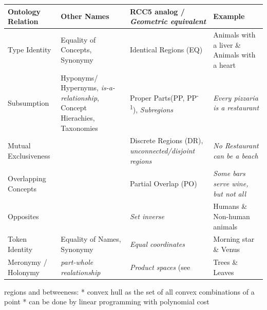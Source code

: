 \begin{tabularx}{1.05\textwidth}{P{0.16\textwidth}|P{0.25\textwidth}|P{0.25\textwidth}|X}
    Ontology Relation & Other Names        & RCC5 \cite{Cohn1997a} analog / \textit{Geometric equivalent} & Example \\ \midrule

    Type Identity     & {\scriptsize Equality of Concepts, Synonymy } & Identical Regions (EQ)      & Animals with a liver \& Animals with a heart \\ 

    Subsumption       & {\scriptsize Hyponyms/ Hypernyms, \textit{is-a-relationship}, Concept Hierachies, Taxonomies }
                                           & Proper Parts(PP, PP\textsuperscript{-1}), \textit{Subregions}
                                                                          & \textit{Every pizzaria is a restaurant} \\  
    
    Mutual 
    Exclusiveness     &                    & Discrete Regions (DR), \textit{unconnected/disjoint regions}
                                                                          & \textit{No Restaurant can be a beach} \\  

    Overlapping 
    Concepts          &                    & Partial Overlap (PO)         & \textit{Some bars serve wine, but not all} \\  

    Opposites         &                    & \textit{Set inverse}         & Humans \& Non-human animals \\ 

    Token Identity    & {\scriptsize Equality of Names, Synonymy } & \textit{Equal coordinates}   & Morning star \& Venus \\ 
    Meronymy / Holonymy & {\scriptsize \textit{part-whole realationship} }& \textit{Product spaces} (see \cite{Fiorini2013}        & Trees \& Leaves
\end{tabularx}

regions and betweeness:
* convex hull as the set of all convex combinations of a point
* can be done by linear programming with polynomial cost


\vspace{4ex}


